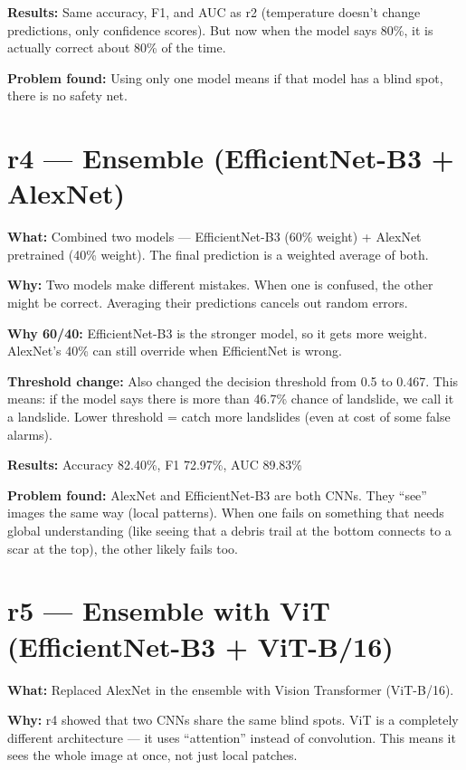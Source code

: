 \documentclass[11pt]{article}
\begin{document}
\textbf{Results:} Same accuracy, F1, and AUC as r2 (temperature doesn't change predictions, only confidence scores). But now when the model says 80\%, it is actually correct about 80\% of the time.

\textbf{Problem found:} Using only one model means if that model has a blind spot, there is no safety net.

\section{r4 --- Ensemble (EfficientNet-B3 + AlexNet)}

\textbf{What:} Combined two models --- EfficientNet-B3 (60\% weight) + AlexNet pretrained (40\% weight). The final prediction is a weighted average of both.

\textbf{Why:} Two models make different mistakes. When one is confused, the other might be correct. Averaging their predictions cancels out random errors.

\textbf{Why 60/40:} EfficientNet-B3 is the stronger model, so it gets more weight. AlexNet's 40\% can still override when EfficientNet is wrong.

\textbf{Threshold change:} Also changed the decision threshold from 0.5 to 0.467. This means: if the model says there is more than 46.7\% chance of landslide, we call it a landslide. Lower threshold = catch more landslides (even at cost of some false alarms).

\textbf{Results:} Accuracy 82.40\%, F1 72.97\%, AUC 89.83\%

\textbf{Problem found:} AlexNet and EfficientNet-B3 are both CNNs. They ``see'' images the same way (local patterns). When one fails on something that needs global understanding (like seeing that a debris trail at the bottom connects to a scar at the top), the other likely fails too.

\section{r5 --- Ensemble with ViT (EfficientNet-B3 + ViT-B/16)}

\textbf{What:} Replaced AlexNet in the ensemble with Vision Transformer (ViT-B/16).

\textbf{Why:} r4 showed that two CNNs share the same blind spots. ViT is a completely different architecture --- it uses ``attention'' instead of convolution. This means it sees the whole image at once, not just local patches.
\end{document}
